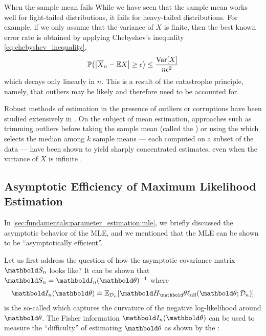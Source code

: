 \begin{rmk}{When the sample mean fails}{}
  While we have seen that the sample mean works well for light-tailed distributions, it fails for heavy-tailed distributions.
  For example, if we only assume that the variance of $X$ is finite, then the best known error rate is obtained by applying Chebyshev's inequality \eqref{eq:chebyshev_inequality}, \begin{align}
    \Pr{\abs{\mean{X}_n - \E*{X}} \geq \epsilon} \leq \frac{\Var{X}}{n \epsilon^2}
  \end{align} which decays only linearly in $n$.
  This is a result of the catastrophe principle, namely, that outliers may be likely and therefore need to be accounted for.

  Robust methods of estimation in the presence of outliers or corruptions have been studied extensively in .
  On the subject of mean estimation, approaches such as trimming outliers before taking the sample mean (called the ) or using the  which selects the median among $k$ sample means --- each computed on a subset of the data --- have been shown to yield sharply concentrated estimates, even when the variance of $X$ is infinite \citep{bubeck2013bandits}.
\end{rmk}

\subsection{Asymptotic Efficiency of Maximum Likelihood Estimation}\label{sec:fundamentals:parameter_estimation:asymptotic_efficiency}

In \cref{sec:fundamentals:parameter_estimation:mle}, we briefly discussed the asymptotic behavior of the MLE, and we mentioned that the MLE can be shown to be ``asymptotically efficient''.

Let us first address the question of how the asymptotic covariance matrix $\mS_n$ looks like?
It can be shown that $\mS_n = \inv{\mI_n(\vtheta)}$ where \begin{align}
  \mI_n(\vtheta) \defeq \E[\spD_n]{\hes_\vtheta \ell_\mathrm{nll}(\vtheta; \spD_n)}
\end{align} is the so-called  which captures the curvature of the negative log-likelihood around $\vtheta$.
The Fisher information $\mI_n(\vtheta)$ can be used to measure the ``difficulty'' of estimating $\vtheta$ as shown by the :

